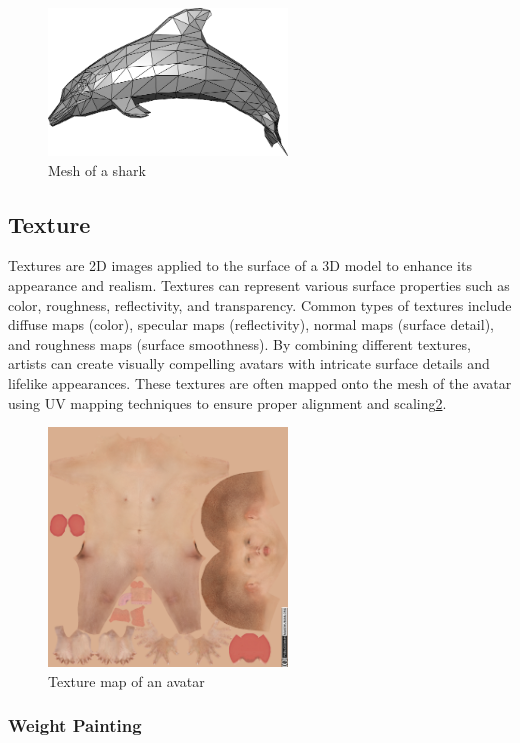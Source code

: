 \begin{figure}
  \centering \includegraphics[width = 2.5in]{images/background_work/mesh.png}
  \caption{Mesh of a shark}
  \label{fig:mesh}
\end{figure}

\subsection{Texture}

Textures are 2D images applied to the surface of a 3D model to enhance its appearance and realism. Textures can represent various surface properties such as color, roughness, reflectivity, and transparency. Common types of textures include diffuse maps (color), specular maps (reflectivity), normal maps (surface detail), and roughness maps (surface smoothness). By combining different textures, artists can create visually compelling avatars with intricate surface details and lifelike appearances. These textures are often mapped onto the mesh of the avatar using UV mapping techniques to ensure proper alignment and scaling\ref{fig:texture_map}.

\begin{figure}
  \centering \includegraphics[width = 2.5in]{images/background_work/texture_map.png}
  \caption{Texture map of an avatar}
  \label{fig:texture_map}
\end{figure}

\subsubsection{Weight Painting}

